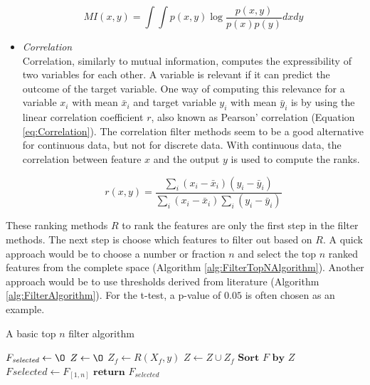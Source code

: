 \documentclass[10pt,a4paper]{article}
\begin{document}
\begin{itemize}
	\begin{equation}\label{eq:MutualInformation}
	MI(x, y) = \int \int p(x, y) \log{\frac{p(x, y)}{p(x)p(y)}} dxdy
	\end{equation}
	
	\item \textit{Correlation} \\
	Correlation, similarly to mutual information, computes the expressibility of two variables for each other. A variable is relevant if it can predict the outcome of the target variable. One way of computing this relevance for a variable $x_i$ with mean $\bar{x }_i$ and target variable $y_i$ with mean $\bar{y}_i$ is by using the linear correlation coefficient $r$, also known as Pearson' correlation\cite{yu2003feature} (Equation \ref{eq:Correlation}). The correlation filter methods seem to be a good alternative for continuous data, but not for discrete data. With continuous data, the correlation between feature $x$ and the output $y$ is used to compute the ranks\cite{hall2000correlation}.
		
	\begin{equation}\label{eq:Correlation}
	r(x,y) = \frac{\sum_{i}(x_i - \bar{x}_i)(y_i -\bar{y}_i)}{\sum_{i}(x_i - \bar{x}_i)\sum_{i}(y_i -\bar{y}_i)}
	\end{equation}
	
	\end{itemize}
	
	These ranking methods $R$ to rank the features are only the first step in the filter methods. The next step is choose which features to filter out based on $R$. A quick approach would be to choose a number or fraction $n$ and select the top $n$ ranked features from the complete space (Algorithm \ref{alg:FilterTopNAlgorithm}). Another approach would be to use thresholds derived from literature\cite{donoho2008higher} (Algorithm \ref{alg:FilterAlgorithm}). For the t-test, a p-value of $0.05$ is often chosen as an example\cite{storey2003statistical, higgins2003measuring}.
	
	\begin{algorithm}[H]
		\caption{A basic top $n$ filter algorithm\cite{Duch2006}}\label{alg:FilterTopNAlgorithm}
		\begin{algorithmic}[1]
			\State $F_{\textit{selected}} \gets \O$ 	
			\State $Z \gets \O$							
			 					
			\State $Z_f \gets R(X_f, y)$ 				 			
			\State $Z \gets Z \cup Z_f$ 				
			\EndFor
			\State $\textbf{Sort } F \textbf{ by } Z$ 
			\State $F_{}selected \gets F_{[1,n]}$ 
			\State $\textbf{return } F_{\textit{selected}}$
			\EndProcedure
		\end{algorithmic}
	\end{algorithm}	
	
\end{document}

